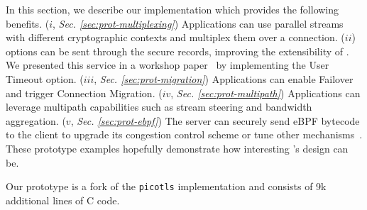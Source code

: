 \label{sec:content}

In this section, we describe our \tcpls implementation which provides the 
following benefits.
($i$, \textit{Sec. \ref{sec:prot-multiplexing}}) Applications can use parallel 
streams with 
different cryptographic 
contexts and multiplex them over a \tcp connection.
($ii$) \tcp options can be sent through the secure \tcpls records, improving 
the extensibility of \tcp. We presented this service in a workshop
paper~\cite{rochet2020tcpls} by implementing the \tcp User Timeout option.
($iii$, \textit{Sec. \ref{sec:prot-migration}}) Applications can enable 
Failover and 
trigger Connection Migration.
($iv$, \textit{Sec. \ref{sec:prot-multipath}}) Applications can leverage 
multipath 
capabilities such as stream 
steering %
and bandwidth aggregation.
($v$, \textit{Sec. \ref{sec:prot-ebpf}}) The server can securely send eBPF 
bytecode to the client 
to upgrade its \tcp congestion control scheme or tune other \tcp 
mechanisms~\cite{brakmo2017tcp,tran2019beyond}. These prototype examples
hopefully demonstrate how interesting \tcpls's design can be.

Our \tcpls prototype is a fork of the \texttt{picotls}  implementation 
and consists of 9k additional lines of C code.

